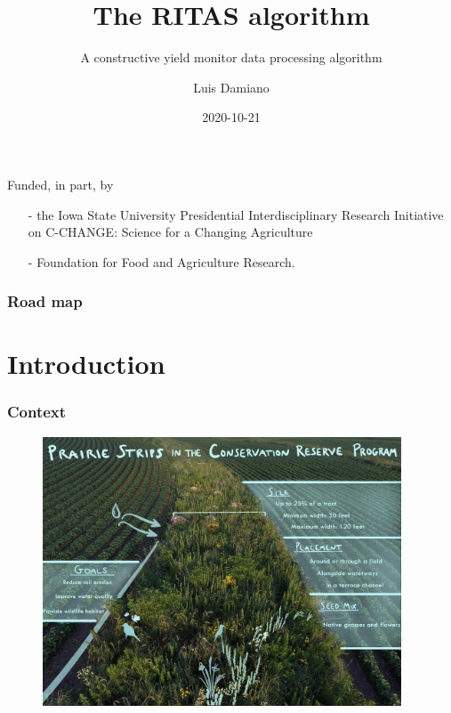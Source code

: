 \documentclass{beamer}
\title[The RITAS algorithm]{The RITAS algorithm}
\subtitle{A constructive yield monitor data processing algorithm}
\author[Damiano, Niemi]{Luis Damiano}
\date{2020-10-21}
\institute[ISU]{Department of Statistics\\Iowa State University}
\begin{document}
\begin{frame}
  \maketitle

  {\footnotesize
    Funded, in part, by
    \begin{itemize}
    \item[-] the Iowa State University Presidential Interdisciplinary
      Research Initiative on C-CHANGE: Science for a Changing Agriculture
    \item[-] Foundation for Food and Agriculture Research.
    \end{itemize}
  }
\end{frame}

\begin{frame}
  
  \frametitle{Road map}
  \tableofcontents
  
\end{frame}


\section{Introduction}

\begin{frame}
  \frametitle{Context}

  
  \begin{figure}
    \includegraphics[width=0.95\textwidth]{./figures/strips_prairie.jpg}
  \end{figure}
    
\end{frame}
\end{document}
